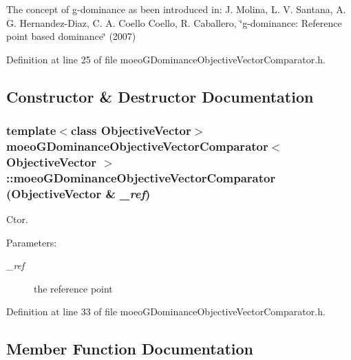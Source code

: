 The concept of g-dominance as been introduced in: J. Molina, L. V. Santana, A. G. Hernandez-Diaz, C. A. Coello Coello, R. Caballero, \char`\"{}g-dominance: Reference point based dominance\char`\"{} (2007) 



Definition at line 25 of file moeo\-GDominance\-Objective\-Vector\-Comparator.h.

\subsection{Constructor \& Destructor Documentation}
\subsubsection{\setlength{\rightskip}{0pt plus 5cm}template$<$class Objective\-Vector$>$ \bf{moeo\-GDominance\-Objective\-Vector\-Comparator}$<$ Objective\-Vector $>$::\bf{moeo\-GDominance\-Objective\-Vector\-Comparator} (Objective\-Vector \& {\em \_\-ref})\hspace{0.3cm}{\tt  [inline]}}\label{classmoeoGDominanceObjectiveVectorComparator_fc4e1f1201b6420d206b28ab98e9ea0d}


Ctor. 

\begin{Desc}
\item[Parameters:]
\begin{description}
\item[{\em \_\-ref}]the reference point \end{description}
\end{Desc}


Definition at line 33 of file moeo\-GDominance\-Objective\-Vector\-Comparator.h.

\subsection{Member Function Documentation}

